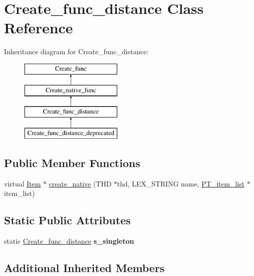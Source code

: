 \hypertarget{classCreate__func__distance}{}\section{Create\+\_\+func\+\_\+distance Class Reference}
\label{classCreate__func__distance}
Inheritance diagram for Create\+\_\+func\+\_\+distance\+:\begin{figure}[H]
\begin{center}
\leavevmode
\includegraphics[height=4.000000cm]{classCreate__func__distance}
\end{center}
\end{figure}
\subsection*{Public Member Functions}
\begin{DoxyCompactItemize}
\item 
virtual \mbox{\hyperlink{classItem}{Item}} $\ast$ \mbox{\hyperlink{classCreate__func__distance_a19ecaaefefe96129814406a898dcc269}{create\+\_\+native}} (T\+HD $\ast$thd, L\+E\+X\+\_\+\+S\+T\+R\+I\+NG name, \mbox{\hyperlink{classPT__item__list}{P\+T\+\_\+item\+\_\+list}} $\ast$item\+\_\+list)
\end{DoxyCompactItemize}
\subsection*{Static Public Attributes}
\begin{DoxyCompactItemize}
\item 
\mbox{\label{classCreate__func__distance_a6174b3a79e7c78e3ac99eeb7fff425fa}} 
static \mbox{\hyperlink{classCreate__func__distance}{Create\+\_\+func\+\_\+distance}} {\bfseries s\+\_\+singleton}
\end{DoxyCompactItemize}
\subsection*{Additional Inherited Members}


